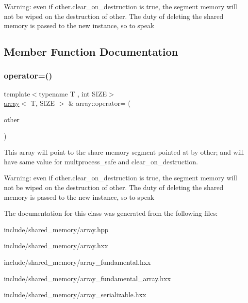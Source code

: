 Warning\+: even if other.\+clear\+\_\+on\+\_\+destruction is true, the segment memory will not be wiped on the destruction of other. The duty of deleting the shared memory is passed to the new instance, so to speak 

\subsection{Member Function Documentation}
\mbox{\label{classshared__memory_1_1array_ad5b4b2841b2785b188a6371cb7f00f1f}} 
\subsubsection{\texorpdfstring{operator=()}{operator=()}}
{\footnotesize\ttfamily template$<$typename T , int S\+I\+ZE$>$ \\
\hyperlink{classshared__memory_1_1array}{array}$<$ T, S\+I\+ZE $>$ \& array\+::operator= (\begin{DoxyParamCaption}\item[{\hyperlink{classshared__memory_1_1array}{array}$<$ T, S\+I\+ZE $>$ \&\&}]{other }\end{DoxyParamCaption})\hspace{0.3cm}{\ttfamily [noexcept]}}



This array will point to the share memory segment pointed at by other; and will have same value for multprocess\+\_\+safe and clear\+\_\+on\+\_\+destruction. 

Warning\+: even if other.\+clear\+\_\+on\+\_\+destruction is true, the segment memory will not be wiped on the destruction of other. The duty of deleting the shared memory is passed to the new instance, so to speak 

The documentation for this class was generated from the following files\+:\begin{DoxyCompactItemize}
\item 
include/shared\+\_\+memory/array.\+hpp\item 
include/shared\+\_\+memory/array.\+hxx\item 
include/shared\+\_\+memory/array\+\_\+fundamental.\+hxx\item 
include/shared\+\_\+memory/array\+\_\+fundamental\+\_\+array.\+hxx\item 
include/shared\+\_\+memory/array\+\_\+serializable.\+hxx\end{DoxyCompactItemize}
